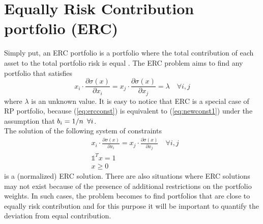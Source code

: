 \section{Equally Risk Contribution portfolio (ERC)}
Simply put, an ERC portfolio is a portfolio where the total contribution of each asset to the total portfolio risk is equal \cite{tutuncu}. The ERC problem aims to find any portfolio that satisfies
\begin{equation}\label{eq:ercconst}
x_i\cdot\frac{\partial\sigma (x)}{\partial x_i} = x_j\cdot\frac{\partial\sigma (x)}{\partial x_j} = \lambda \quad \forall i,j
\end{equation}
where $\lambda$ is an unknown value. It is easy to notice that ERC is a special case of RP portfolio, because (\ref{eq:ercconst}) is equivalent to (\ref{eq:newconst1}) under the assumption that $b_i = 1/n \hspace{0.5em} \forall i$.\\
The solution of the following system of constraints
\begin{equation}\label{eq:b}
\begin{aligned}
&x_i\cdot\frac{\partial\sigma (x)}{\partial x_i} = x_j\cdot\frac{\partial\sigma (x)}{\partial x_j} \quad \forall i,j\\
&\mathds{1}^T x =1\\
&x \geq 0
\end{aligned}
\end{equation}
is a (normalized) ERC solution. There are also situations where ERC solutions may not exist because of the presence of additional restrictions on the portfolio weights. In such cases, the problem becomes to find portfolios that are close to equally risk contribution and for this purpose it will be important to quantify the deviation from equal contribution.

